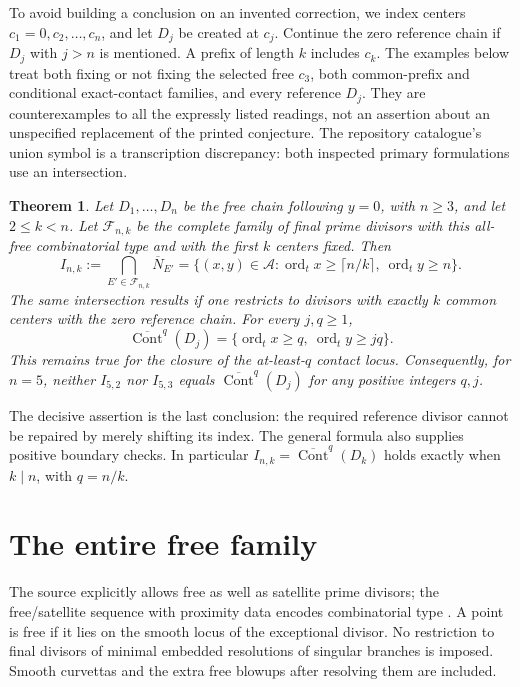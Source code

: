 \documentclass[11pt]{article}
\newtheorem{theorem}{Theorem}
\newcommand{\ord}{\operatorname{ord}_t}
\newcommand{\Nash}{\overline N}
\newcommand{\Cont}{\overline{\operatorname{Cont}}}
\newcommand{\A}{\mathcal A}
\begin{document}
To avoid building a conclusion on an invented correction, we index
centers \(c_1=0,c_2,\ldots,c_n\), and let \(D_j\) be created at \(c_j\).
Continue the zero reference chain if \(D_j\) with \(j>n\) is mentioned.
A prefix of length \(k\) includes \(c_k\). The examples below treat
both fixing or not fixing the selected free \(c_3\), both common-prefix
and conditional exact-contact families, and every reference \(D_j\).
They are counterexamples to all the expressly listed readings, not
an assertion about an unspecified replacement of the printed conjecture.
The repository catalogue's union symbol is a transcription discrepancy:
both inspected primary formulations use an intersection.

\begin{theorem}\label{thm:main}
Let \(D_1,\ldots,D_n\) be the free chain following \(y=0\), with
\(n\geq3\), and let \(2\leq k<n\). Let \(\mathcal F_{n,k}\) be the
complete family of final prime divisors with this all-free combinatorial
type and with the first \(k\) centers fixed. Then
\[
 I_{n,k}:=\bigcap_{E'\in\mathcal F_{n,k}}\Nash_{E'}
   =\{(x,y)\in\A:\ord x\geq\lceil n/k\rceil,\ \ord y\geq n\}.
 \tag{1}\label{eq:intersection}
\]
The same intersection results if one restricts to divisors with exactly
\(k\) common centers with the zero reference chain.
For every \(j,q\geq1\),
\[
 \Cont^q(D_j)=\{\ord x\geq q,\ \ord y\geq jq\}.                 \tag{2}
 \label{eq:reference}
\]
This remains true for the closure of the at-least-\(q\) contact locus.
Consequently, for \(n=5\), neither \(I_{5,2}\) nor \(I_{5,3}\)
equals \(\Cont^q(D_j)\) for any positive integers \(q,j\).
\end{theorem}

The decisive assertion is the last conclusion: the required reference
divisor cannot be repaired by merely shifting its index. The general
formula also supplies positive boundary checks. In particular
\(I_{n,k}=\Cont^q(D_k)\) holds exactly when \(k\mid n\), with \(q=n/k\).

\section{The entire free family}

The source explicitly allows free as well as satellite prime divisors;
the free/satellite sequence with proximity data encodes combinatorial
type \cite[pp.~5--7]{original}. A point is free if it lies on the smooth
locus of the exceptional divisor. No restriction to final divisors of
minimal embedded resolutions of singular branches is imposed. Smooth
curvettas and the extra free blowups after resolving them are included.
\end{document}
